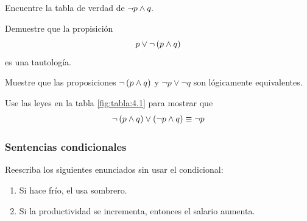 \documentclass[xcolor={svgnames},
  hyperref={colorlinks}, 
  spanish, 12pt]{beamer}
\numberwithin{equation}{section} %
\numberwithin{figure}{section} %
\begin{document}
\begin{frame}
 \begin{solved}
  Encuentre la tabla de verdad de $\neg p \wedge q.$
 \end{solved}

\end{frame}

\begin{frame}
 \begin{solved}
  Demuestre que la propisici\'on 
  $$
  p \vee \neg \left( p\wedge q \right)
  $$ es una tautolog\'ia.
 \end{solved}

\end{frame}

\begin{frame}
 \begin{solved}
  Muestre que las proposiciones $\neg\left( p \wedge q \right)$ y $\neg p \vee \neg q$ son l\'ogicamente equivalentes.
 \end{solved}

\end{frame}

\begin{frame}
 \begin{solved}
  Use las leyes en la tabla \ref{fig:tabla:4.1} para mostrar que 
  $$
  \neg \left( p \wedge q \right) \vee \left( \neg p \wedge  q \right) \equiv \neg p
  $$
 \end{solved}

\end{frame}

\subsubsection{Sentencias condicionales}

\begin{frame}
 \begin{solved}
  \label{lip:sol:4.6}
  Reescriba los siguientes enunciados sin usar el condicional:
  \begin{enumerate}
   \item Si hace fr\'io, el usa sombrero. \pause
   \item Si la productividad se incrementa, entonces el salario aumenta.
  \end{enumerate}

 \end{solved}

\end{frame}
\end{document}
